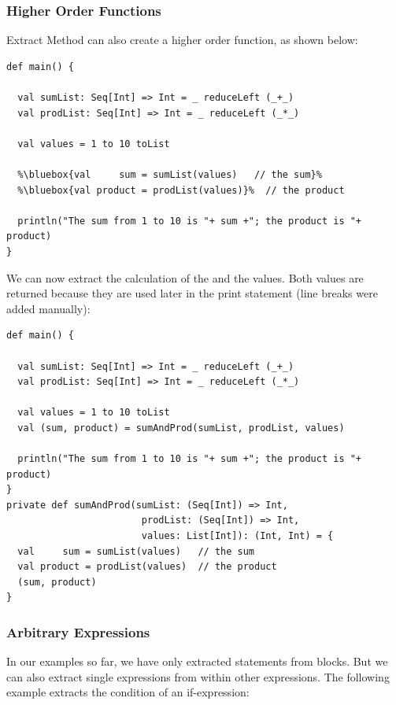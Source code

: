 \documentclass[10pt,a4paper,oneside]{scrreprt}
\begin{document}
\subsubsection{Higher Order Functions}

Extract Method can also create a higher order function, as shown below:

\begin{lstlisting}  
def main() {
  
  val sumList: Seq[Int] => Int = _ reduceLeft (_+_)
  val prodList: Seq[Int] => Int = _ reduceLeft (_*_)
  
  val values = 1 to 10 toList
  
  %\bluebox{val     sum = sumList(values)   // the sum}%
  %\bluebox{val product = prodList(values)}%  // the product

  println("The sum from 1 to 10 is "+ sum +"; the product is "+ product)
}
\end{lstlisting}

We can now extract the calculation of the  and the  values. Both values are returned because they are used later in the print statement (line breaks were added manually):

\begin{lstlisting}
def main() {
  
  val sumList: Seq[Int] => Int = _ reduceLeft (_+_)
  val prodList: Seq[Int] => Int = _ reduceLeft (_*_)
  
  val values = 1 to 10 toList
  val (sum, product) = sumAndProd(sumList, prodList, values)

  println("The sum from 1 to 10 is "+ sum +"; the product is "+ product)
}
private def sumAndProd(sumList: (Seq[Int]) => Int, 
                        prodList: (Seq[Int]) => Int, 
                        values: List[Int]): (Int, Int) = {
  val     sum = sumList(values)   // the sum
  val product = prodList(values)  // the product
  (sum, product)
}
\end{lstlisting}

\subsubsection{Arbitrary Expressions}

In our examples so far, we have only extracted statements from blocks. But we can also extract single expressions from within other expressions. The following example extracts the condition of an if-expression:
\end{document}
